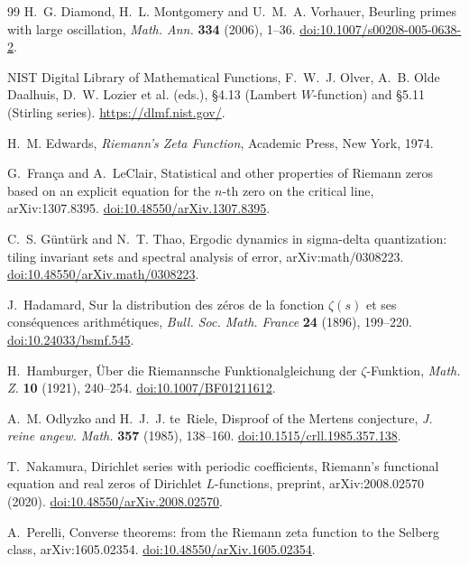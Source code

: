 \documentclass[11pt,reqno]{amsart}
\numberwithin{equation}{section}
\theoremstyle{plain}
\theoremstyle{definition}
\theoremstyle{remark}
\begin{document}
\begin{thebibliography}{99}
H.~G. Diamond, H.~L. Montgomery and U.~M.~A. Vorhauer, Beurling primes with large oscillation, \emph{Math. Ann.} \textbf{334} (2006), 1--36.
\href{https://doi.org/10.1007/s00208-005-0638-2}{doi:10.1007/s00208-005-0638-2}.

NIST Digital Library of Mathematical Functions, F.~W.~J. Olver, A.~B. Olde Daalhuis, D.~W. Lozier et al. (eds.), \S4.13 (Lambert $W$-function) and \S5.11 (Stirling series).
\url{https://dlmf.nist.gov/}.

H.~M. Edwards, \emph{Riemann's Zeta Function}, Academic Press, New York, 1974.

G.~Fran\c{c}a and A.~LeClair, Statistical and other properties of Riemann zeros based on an explicit equation for the $n$-th zero on the critical line, arXiv:1307.8395.
\href{https://doi.org/10.48550/arXiv.1307.8395}{doi:10.48550/arXiv.1307.8395}.

C.~S. G\"unt\"urk and N.~T. Thao, Ergodic dynamics in sigma-delta quantization: tiling invariant sets and spectral analysis of error, arXiv:math/0308223.
\href{https://doi.org/10.48550/arXiv.math/0308223}{doi:10.48550/arXiv.math/0308223}.

J.~Hadamard, Sur la distribution des z\'eros de la fonction $\zeta(s)$ et ses cons\'equences arithm\'etiques, \emph{Bull. Soc. Math. France} \textbf{24} (1896), 199--220.
\href{https://doi.org/10.24033/bsmf.545}{doi:10.24033/bsmf.545}.

H.~Hamburger, \"Uber die Riemannsche Funktionalgleichung der $\zeta$-Funktion, \emph{Math. Z.} \textbf{10} (1921), 240--254.
\href{https://doi.org/10.1007/BF01211612}{doi:10.1007/BF01211612}.

A.~M. Odlyzko and H.~J.~J. te~Riele, Disproof of the Mertens conjecture, \emph{J. reine angew. Math.} \textbf{357} (1985), 138--160.
\href{https://doi.org/10.1515/crll.1985.357.138}{doi:10.1515/crll.1985.357.138}.

T.~Nakamura, Dirichlet series with periodic coefficients, Riemann's functional equation and real zeros of Dirichlet $L$-functions, preprint, arXiv:2008.02570 (2020).
\href{https://doi.org/10.48550/arXiv.2008.02570}{doi:10.48550/arXiv.2008.02570}.

A.~Perelli, Converse theorems: from the Riemann zeta function to the Selberg class, arXiv:1605.02354.
\href{https://doi.org/10.48550/arXiv.1605.02354}{doi:10.48550/arXiv.1605.02354}.


\end{thebibliography}
\end{document}
